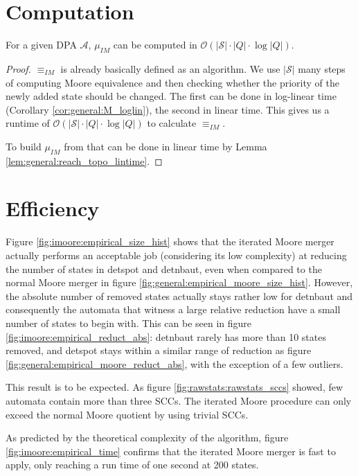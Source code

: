 \section{Computation}
\begin{lem}
	For a given DPA $\mathcal{A}$, $\mu_{IM}$ can be computed in $\mathcal{O}(|\mathcal{S}| \cdot |Q| \cdot \log |Q|)$.
\end{lem}

\begin{proof}
	$\equiv_{IM}$ is already basically defined as an algorithm. We use $|\mathcal{S}|$ many steps of computing Moore equivalence and then checking whether the priority of the newly added state should be changed. The first can be done in log-linear time (Corollary \ref{cor:general:M_loglin}), the second in linear time. This gives us a runtime of $\mathcal{O}(|\mathcal{S}| \cdot |Q| \cdot \log |Q|)$ to calculate $\equiv_{IM}$.

	To build $\mu_{IM}$ from that can be done in linear time by Lemma \ref{lem:general:reach_topo_lintime}.
\end{proof}


\section{Efficiency}
Figure \ref{fig:imoore:empirical_size_hist} shows that the iterated Moore merger actually performs an acceptable job (considering its low complexity) at reducing the number of states in \textsf{detspot} and \textsf{detnbaut}, even when compared to the normal Moore merger in figure \ref{fig:general:empirical_moore_size_hist}. However, the absolute number of removed states actually stays rather low for \textsf{detnbaut} and consequently the automata that witness a large relative reduction have a small number of states to begin with. This can be seen in figure \ref{fig:imoore:empirical_reduct_abs}: \textsf{detnbaut} rarely has more than 10 states removed, and \textsf{detspot} stays within a similar range of reduction as figure \ref{fig:general:empirical_moore_reduct_abs}, with the exception of a few outliers.

This result is to be expected. As figure \ref{fig:rawstats:rawstats_sccs} showed, few automata contain more than three SCCs. The iterated Moore procedure can only exceed the normal Moore quotient by using trivial SCCs.

As predicted by the theoretical complexity of the algorithm, figure \ref{fig:imoore:empirical_time} confirms that the iterated Moore merger is fast to apply, only reaching a run time of one second at 200 states.


